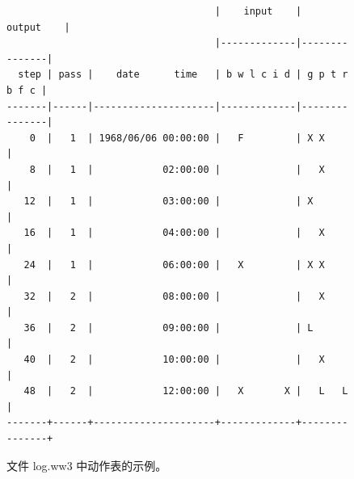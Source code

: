 \begin{figure}
{\small \begin{verbatim}
                                    |    input    |     output    |
                                    |-------------|---------------|
  step | pass |    date      time   | b w l c i d | g p t r b f c |
-------|------|---------------------|-------------|---------------|
    0  |   1  | 1968/06/06 00:00:00 |   F         | X X           |
    8  |   1  |            02:00:00 |             |   X           |
   12  |   1  |            03:00:00 |             | X             |
   16  |   1  |            04:00:00 |             |   X           |
   24  |   1  |            06:00:00 |   X         | X X           |
   32  |   2  |            08:00:00 |             |   X           |
   36  |   2  |            09:00:00 |             | L             |
   40  |   2  |            10:00:00 |             |   X           |
   48  |   2  |            12:00:00 |   X       X |   L   L       |
-------+------+---------------------+-------------+---------------+ 
\end{verbatim} }
\caption{文件 {\file log.ww3} 中动作表的示例。} \label{fig:log}
\botline
\end{figure}
